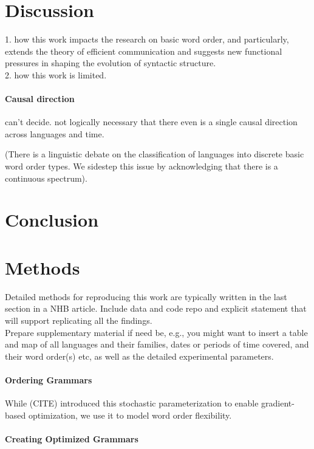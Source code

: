 \documentclass[11pt,a4paper]{article}
\begin{document}
\section{Discussion}

{\color{blue} 1. how this work impacts the research on basic word order, and particularly, extends the theory of efficient communication and suggests new functional pressures in shaping the evolution of syntactic structure.}\\

{\color{blue} 2. how this work is limited.} \paragraph{Causal direction} can't decide. not logically necessary that there even is a single causal direction across languages and time.


(There is a linguistic debate on the classification of languages into discrete basic word order types. We sidestep this issue by acknowledging that there is a continuous spectrum).


\section{Conclusion}

\section*{Methods}

{\color{blue}Detailed methods for reproducing this work are typically written in the last section in a NHB article. Include data and code repo and explicit statement that will support replicating all the findings.}\\

{\color{blue}Prepare supplementary material if need be, e.g., you might want to insert a table and map of all languages and their families, dates or periods of time covered, and their word order(s) etc, as well as the detailed experimental parameters.}


\paragraph{Ordering Grammars}





While (CITE) introduced this stochastic parameterization to enable gradient-based optimization, we use it to model word order flexibility.

\paragraph{Creating Optimized Grammars}






\end{document}
